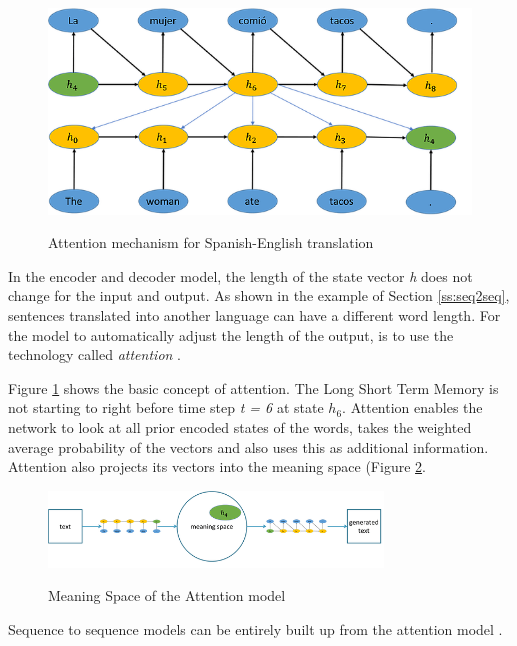 \begin{figure}
	\begin{center}
		\includegraphics[width=4.5in]{photos/w1-11}\\
		\caption{Attention mechanism for Spanish-English translation \cite{mugan}}\label{attention1}
	\end{center}
\end{figure}
In the encoder and decoder model, the length of the state vector \textit{h} does not change for the input and output. As shown in the example of Section \ref{ss:seq2seq}, sentences translated into another language can have a different word length. For the model to automatically adjust the length of the output, is to use the technology called \textit{attention} \cite{attention} \cite{attention2}.

Figure \ref{attention1} shows the basic concept of attention. The Long Short Term Memory is not starting to right before time step \textit{t = 6} at state \textit{\(h_{6}\)}. Attention enables the network to look at all prior encoded states of the words, takes the weighted average probability of the vectors and also uses this as additional information. Attention also projects its vectors into the meaning space (Figure \ref{meaningspace}. 

\begin{figure}
	\begin{center}
		\includegraphics[width=3.5in]{photos/w1-21}\\
		\caption{Meaning Space of the Attention model \cite{mugan}}\label{meaningspace}
	\end{center}
\end{figure}

Sequence to sequence models can be entirely built up from the attention model \cite{attention2}. 

